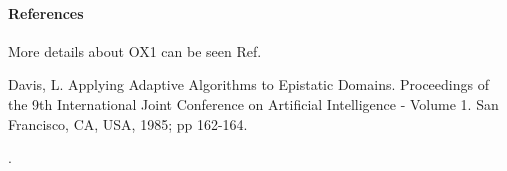 \documentclass[letterpaper,10pt,english]{sphinxmanual}
\begin{document}
\begin{fulllineitems}
\begin{quote}
\begin{description}
\begin{description}
\end{description}

\end{description}\end{quote}
\paragraph{References}

More details about OX1 can be seen Ref. %
\begin{footnote}[3]\sphinxAtStartFootnote
Davis, L. Applying Adaptive Algorithms to Epistatic Domains. Proceedings
of the 9th International Joint Conference on Artificial Intelligence -
Volume 1. San Francisco, CA, USA, 1985; pp 162-164.
%
\end{footnote}.

\end{fulllineitems}

\end{document}
